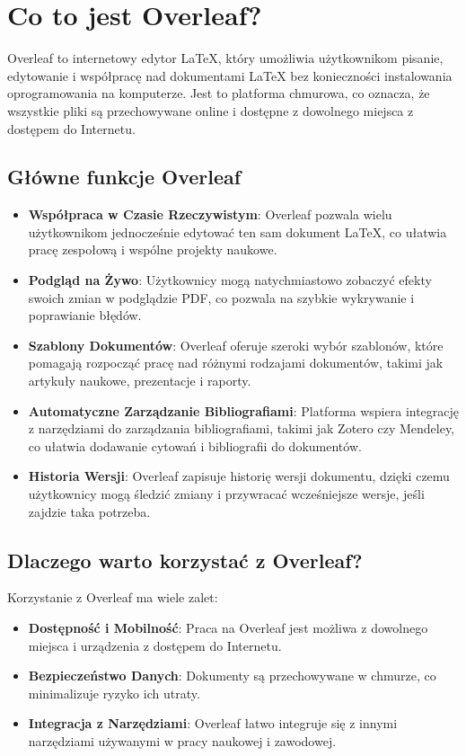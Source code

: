 \section{Co to jest Overleaf?}
\label{sec:overleaf}

Overleaf to internetowy edytor LaTeX, który umożliwia użytkownikom pisanie, edytowanie i współpracę nad dokumentami LaTeX bez konieczności instalowania oprogramowania na komputerze. Jest to platforma chmurowa, co oznacza, że wszystkie pliki są przechowywane online i dostępne z dowolnego miejsca z dostępem do Internetu.

\subsection{Główne funkcje Overleaf}

\begin{itemize}
    \item \textbf{Współpraca w Czasie Rzeczywistym}: Overleaf pozwala wielu użytkownikom jednocześnie edytować ten sam dokument LaTeX, co ułatwia pracę zespołową i wspólne projekty naukowe.
    \item \textbf{Podgląd na Żywo}: Użytkownicy mogą natychmiastowo zobaczyć efekty swoich zmian w podglądzie PDF, co pozwala na szybkie wykrywanie i poprawianie błędów.
    \item \textbf{Szablony Dokumentów}: Overleaf oferuje szeroki wybór szablonów, które pomagają rozpocząć pracę nad różnymi rodzajami dokumentów, takimi jak artykuły naukowe, prezentacje i raporty.
    \item \textbf{Automatyczne Zarządzanie Bibliografiami}: Platforma wspiera integrację z narzędziami do zarządzania bibliografiami, takimi jak Zotero czy Mendeley, co ułatwia dodawanie cytowań i bibliografii do dokumentów.
    \item \textbf{Historia Wersji}: Overleaf zapisuje historię wersji dokumentu, dzięki czemu użytkownicy mogą śledzić zmiany i przywracać wcześniejsze wersje, jeśli zajdzie taka potrzeba.
\end{itemize}

\subsection{Dlaczego warto korzystać z Overleaf?}

Korzystanie z Overleaf ma wiele zalet:
\begin{itemize}
    \item \textbf{Dostępność i Mobilność}: Praca na Overleaf jest możliwa z dowolnego miejsca i urządzenia z dostępem do Internetu.
    \item \textbf{Bezpieczeństwo Danych}: Dokumenty są przechowywane w chmurze, co minimalizuje ryzyko ich utraty.
    \item \textbf{Integracja z Narzędziami}: Overleaf łatwo integruje się z innymi narzędziami używanymi w pracy naukowej i zawodowej.
\end{itemize}